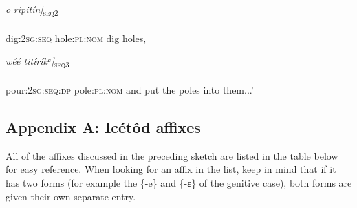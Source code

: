 \ea\label{ex:}
\gll {[úgidu}\textit{o}\textit{   ripitín]}\textsc{\textsubscript{seq2}} \\
    \\
dig:\textsc{2sg:seq}   hole:\textsc{pl:nom}
\glt dig holes,
\z  


\ea\label{ex:}
\gll {[otíduk}\textit{w}\textit{éé     titíríkᵃ]}\textsc{\textsubscript{seq3}} \\
    \\
pour:\textsc{2sg:seq:dp}   pole:\textsc{pl:nom}
\glt and put the poles into them...’
\z  

\subsection{Appendix A: Icétôd affixes}

All of the affixes discussed in the preceding sketch are listed in the table below for easy reference. When looking for an affix in the list, keep in mind that if it has two forms (for example the \{-e\} and \{-ɛ\} of the genitive case), both forms are given their own separate entry.

